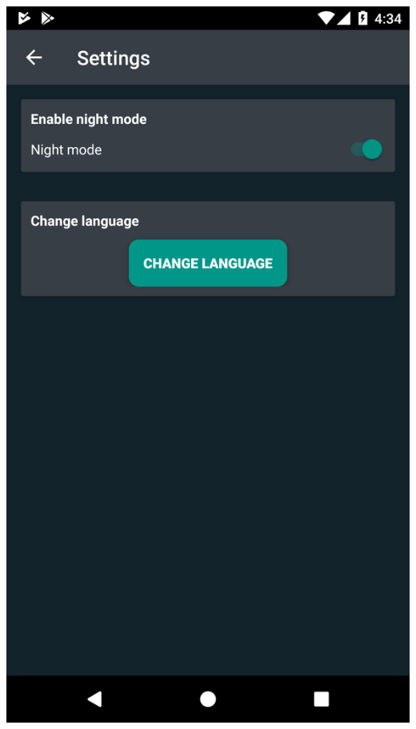 \documentclass[xetex,mathserif,serif, xcolor=table]{beamer}
\begin{document}
\begin{frame}
\begin{columns}[t]
                    \includegraphics[scale=0.09]{images/settings.png}
                    
            \end{columns}
	\end{frame}	
	
\end{document}
